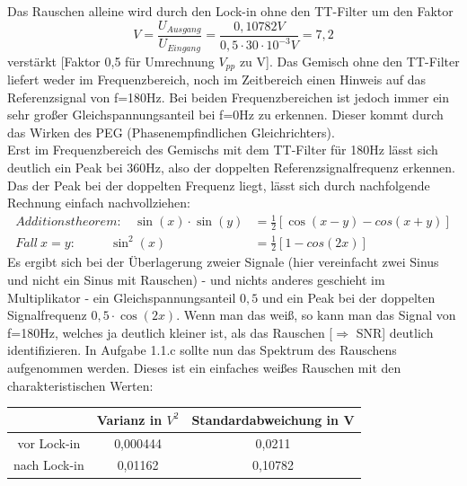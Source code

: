\documentclass{scrartcl}						%
\begin{document}
			\flushleft
			Das Rauschen alleine wird durch den Lock-in ohne den TT-Filter um den Faktor 
			\begin{equation*}
			 V=\frac{U_{Ausgang}}{U_{Eingang}}= \frac{0,10782 V }{0,5\cdot 30\cdot 10^{-3}V}=7,2
			\end{equation*} verstärkt [Faktor 0,5 für Umrechnung $ V_{pp} $ zu V].
			Das Gemisch ohne den TT-Filter liefert weder im Frequenzbereich, noch im Zeitbereich einen Hinweis auf das Referenzsignal von f=180Hz. Bei beiden Frequenzbereichen ist jedoch immer ein sehr großer Gleichspannungsanteil bei f=0Hz zu erkennen. Dieser kommt durch das Wirken des PEG (Phasenempfindlichen Gleichrichters).\\
			Erst im Frequenzbereich des Gemischs mit dem TT-Filter für 180Hz lässt sich deutlich ein Peak bei 360Hz, also der doppelten Referenzsignalfrequenz erkennen. Das der Peak bei der doppelten Frequenz liegt, lässt sich durch nachfolgende Rechnung einfach nachvollziehen:
			\begin{align*}
				Additionstheorem: \ \ \ \ \sin (x) \cdot \sin(y)&=\frac{1}{2}\left[\cos (x-y)-cos(x+y) \right] \\
				Fall \ x=y: \ \ \ \ \ \ \ \ \ \ \ \ \sin^2(x)&=\frac{1}{2}\left[1-cos(2x) \right]
			\end{align*}
			Es ergibt sich bei der Überlagerung zweier Signale (hier vereinfacht zwei Sinus und nicht ein Sinus mit Rauschen) - und nichts anderes geschieht im Multiplikator - ein Gleichspannungsanteil $ 0,5 $ und ein Peak bei der doppelten Signalfrequenz $ 0,5\cdot \cos(2x)$.
			Wenn man das weiß, so kann man das Signal von f=180Hz, welches ja deutlich kleiner ist, als das Rauschen [$ \Longrightarrow $ SNR] deutlich identifizieren.
			\newline
			In Aufgabe 1.1.c sollte nun das Spektrum des Rauschens aufgenommen werden. Dieses ist ein einfaches weißes Rauschen mit den charakteristischen Werten:
			\center
			\begin{tabular}{|c|c|c|}
			\hline  & Varianz in $V^2$ & Standardabweichung in V \\ 
			\hline vor Lock-in & 0,000444 & 0,0211 \\ 
			\hline nach Lock-in & 0,01162 & 0,10782 \\ 
			\hline 
			\end{tabular} 
			\flushleft
		
\end{document}
